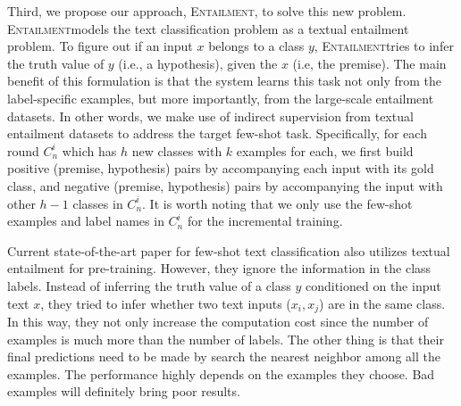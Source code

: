 \documentclass[11pt]{article}
\newcommand{\modelname}{\textsc{Entailment}}
\begin{document}
Third, we propose our approach, \modelname, to solve this new problem. \modelname\enspace models the text classification problem as a textual entailment \cite{dagan2013recognizing} problem. To figure out if an input $x$ belongs to a class $y$, \modelname\enspace tries to infer the truth value of $y$ (i.e., a hypothesis), given the $x$ (i.e, the premise). The main benefit of this formulation is that the system learns this task not only from  the label-specific examples, but more importantly, from the large-scale entailment datasets. In other words, we make use of indirect supervision from textual entailment datasets to address the target few-shot task. Specifically, for each round $C_n^i$ which has $h$ new classes with $k$ examples for each, we first build positive (premise, hypothesis) pairs by accompanying each input with its gold class, and negative (premise, hypothesis) pairs by accompanying the input with other $h-1$ classes in $C_n^i$. It is worth noting that we only use the few-shot examples and label names in $C_n^i$ for the incremental training.

Current state-of-the-art paper \cite{zhangdiscriminative} for few-shot text classification also utilizes textual entailment for pre-training. However, they ignore the information in the class labels. Instead of inferring the truth value of a class $y$ conditioned on the input text $x$, they tried to infer whether two text inputs ($x_i, x_j$) are in the same class. In this way, they not only increase the computation cost since the number of examples is much more than the number of labels. The other thing is that their final predictions need to be made by search the nearest neighbor among all the examples. The performance highly depends on the examples they choose. Bad examples will definitely bring poor results. 




\end{document}
